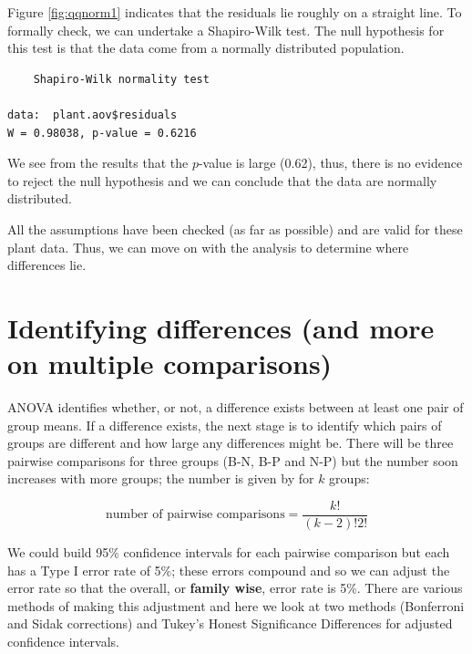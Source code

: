 \documentclass[
  oneside]{krantz}
\newenvironment{Shaded}{\begin{snugshade}}{\end{snugshade}}
\newcommand{\FunctionTok}[1]{\textcolor[rgb]{0.00,0.00,0.00}{#1}}
\newcommand{\NormalTok}[1]{#1}
\newcommand{\SpecialCharTok}[1]{\textcolor[rgb]{0.00,0.00,0.00}{#1}}
\begin{document}
Figure \ref{fig:qqnorm1} indicates that the residuals lie roughly on a straight line. To formally check, we can undertake a Shapiro-Wilk test. The null hypothesis for this test is that the data come from a normally distributed population.

\begin{Shaded}
\end{Shaded}

\begin{verbatim}
    Shapiro-Wilk normality test

data:  plant.aov$residuals
W = 0.98038, p-value = 0.6216
\end{verbatim}

We see from the results that the \(p\)-value is large (0.62), thus, there is no evidence to reject the null hypothesis and we can conclude that the data are normally distributed.

All the assumptions have been checked (as far as possible) and are valid for these plant data. Thus, we can move on with the analysis to determine where differences lie.

\hypertarget{identifying-differences-and-more-on-multiple-comparisons}{%
\section{Identifying differences (and more on multiple comparisons)}\label{identifying-differences-and-more-on-multiple-comparisons}}

ANOVA identifies whether, or not, a difference exists between at least one pair of group means. If a difference exists, the next stage is to identify which pairs of groups are different and how large any differences might be. There will be three pairwise comparisons for three groups (B-N, B-P and N-P) but the number soon increases with more groups; the number is given by for \(k\) groups:

\[\textrm{number of pairwise comparisons} = \frac{k!}{(k-2)!2!}\]

We could build 95\% confidence intervals for each pairwise comparison but each has a Type I error rate of 5\%; these errors compound and so we can adjust the error rate so that the overall, or \textbf{family wise}, error rate is 5\%. There are various methods of making this adjustment and here we look at two methods (Bonferroni and Sidak corrections) and Tukey's Honest Significance Differences for adjusted confidence intervals.
\end{document}
